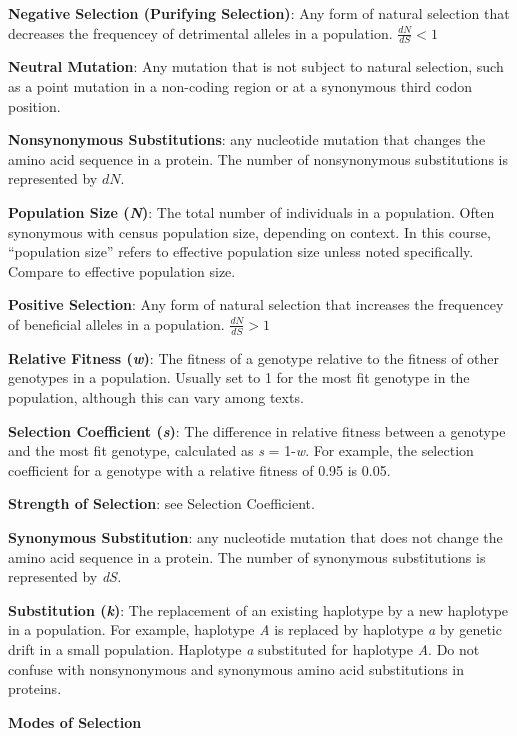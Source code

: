 \documentclass[11pt]{article}
\begin{document}
\textbf{Negative Selection (Purifying Selection)}: Any form of natural
selection that decreases the frequencey of detrimental alleles in a
population. $\frac{dN}{dS} < 1$\medskip

\textbf{Neutral Mutation}: Any mutation that is not subject to natural
selection, such as a point mutation in a non-coding region or at a
synonymous third codon position.\medskip

\textbf{Nonsynonymous Substitutions}: any nucleotide mutation that
changes the amino acid sequence in a protein. The number of
nonsynonymous substitutions is represented by $dN$.\medskip

\textbf{Population Size (\emph{N})}: The total number of individuals in
a population. Often synonymous with census population size, depending
on context. In this course, ``population size'' refers to
effective population size unless noted specifically.  Compare to effective population size.\medskip

\textbf{Positive Selection}: Any form of natural selection that
increases the frequencey of beneficial alleles in a population. $\frac{dN}{dS} > 1$\medskip

\textbf{Relative Fitness (\emph{w})}: The fitness of a genotype relative
to the fitness of other genotypes in a population. Usually set to 1 for
the most fit genotype in the population, although this can vary among
texts.\medskip

\textbf{Selection Coefficient (\emph{s})}: The difference in relative
fitness between a genotype and the most fit genotype, calculated as
\emph{s} = 1-\emph{w}. For example, the selection coefficient for a
genotype with a relative fitness of 0.95 is 0.05.\medskip

\textbf{Strength of Selection}: see Selection Coefficient.\medskip

\textbf{Synonymous Substitution}: any nucleotide mutation that does not
change the amino acid sequence in a protein. The number of synonymous
substitutions is represented by \emph{dS.}\medskip

\textbf{Substitution (\emph{k})}: The replacement of an existing
haplotype by a new haplotype in a population. For example, haplotype
\emph{A} is replaced by haplotype \emph{a} by genetic drift in a small
population. Haplotype \emph{a} substituted for haplotype \emph{A}. Do
not confuse with nonsynonymous and synonymous amino acid substitutions
in proteins.\medskip

\textbf{Modes of Selection}\medskip
\end{document}
